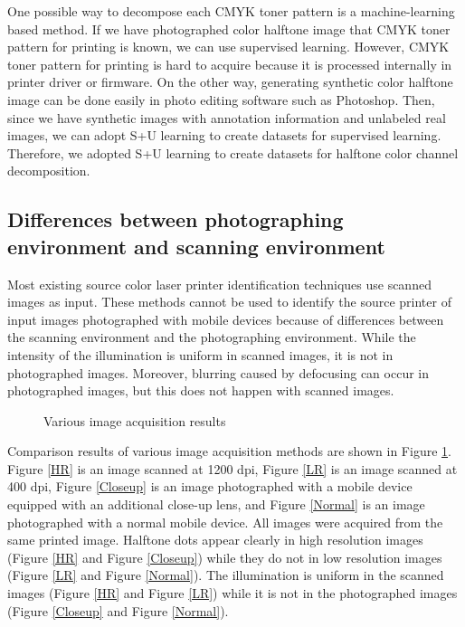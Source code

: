 \documentclass[5p, times]{elsarticle}
\begin{document}
One possible way to decompose each CMYK toner pattern is a machine-learning based method. If we have photographed color halftone image that CMYK toner pattern for printing is known, we can use supervised learning. However, CMYK toner pattern for printing is hard to acquire because it is processed internally in printer driver or firmware. On the other way, generating synthetic color halftone image can be done easily in photo editing software such as Photoshop. Then, since we have synthetic images with annotation information and unlabeled real images, we can adopt S+U learning to create datasets for supervised learning. Therefore, we adopted S+U learning to create datasets for halftone color channel decomposition.

\subsection{Differences between photographing environment and scanning environment}

Most existing source color laser printer identification techniques use scanned images as input. These methods cannot be used to identify the source printer of input images photographed with mobile devices because of differences between the scanning environment and the photographing environment. While the intensity of the illumination is uniform in scanned images, it is not in photographed images. Moreover, blurring caused by defocusing can occur in photographed images, but this does not happen with scanned images.

\begin{figure}[t!]
    \centerline
    {
    	    	\hspace{2pt}
    }
	\centerline{	
    	    	\hspace{2pt}
	}
    \caption{Various image acquisition results}
    \label{ImageAcquisition}	
\end{figure}

Comparison results of various image acquisition methods are shown in Figure \ref{ImageAcquisition}. Figure \ref{HR} is an image scanned at 1200 dpi, Figure \ref{LR} is an image scanned at 400 dpi, Figure \ref{Closeup} is an image photographed with a mobile device equipped with an additional close-up lens, and Figure \ref{Normal} is an image photographed with a normal mobile device. All images were acquired from the same printed image. Halftone dots appear clearly in high resolution images (Figure \ref{HR} and Figure \ref{Closeup}) while they do not in low resolution images (Figure \ref{LR} and Figure \ref{Normal}). The illumination is uniform in the scanned images (Figure \ref{HR} and Figure \ref{LR}) while it is not in the photographed images (Figure \ref{Closeup} and Figure \ref{Normal}).
\end{document}
